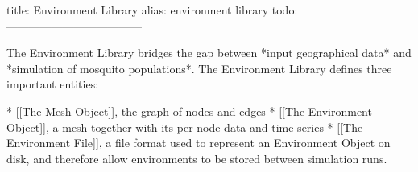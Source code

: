 title: Environment Library
alias: environment library
todo:
------------------------------------

The Environment Library bridges the gap between *input geographical data* and *simulation of mosquito populations*. The Environment Library defines three important entities:

* [[The Mesh Object]], the graph of nodes and edges
	* [[The Environment Object]], a mesh together with its per-node data and time series
	* [[The Environment File]], a file format used to represent an Environment Object on disk, and therefore allow environments to be stored between simulation runs.
